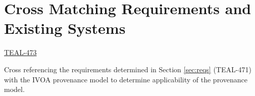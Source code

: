 \section{Cross Matching Requirements and Existing Systems}\label{sec:cmatch}

\href{https://jira.skatelescope.org/browse/TEAL-473}{TEAL-473} 

Cross referencing the requirements determined in Section \ref{sec:reqs} (TEAL-471) with the IVOA provenance model to determine applicability of the provenance model. 